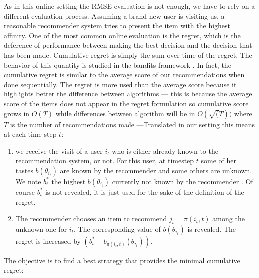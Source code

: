 \documentclass[twoside,leqno,twocolumn]{article}
\newcommand{\pp}[1]{\color{red}(pp) #1\color{black}}
\newcommand{\jm}[1]{{\color{TealBlue}(jm) #1\color{black}}}
\newcommand{\hai}[1]{\color{blue}(hai) #1\color{black}}
\begin{document}
As in this online setting the RMSE evaluation is not enough, we have to rely on a different evaluation process.
Assuming a brand new user is visiting us, a reasonable recommender system tries to present the item with the highest affinity. %
One of the most common online evaluation is the regret, which is the deference of performance between making the best decision and the decision that has been made. Cumulative regret is simply the sum over time of the regret. The behavior of this quantity is studied in the bandits framework \cite{Auer:2002:FAM:599614.599677, DBLP:conf/nips/Abbasi-YadkoriPS11}.  
In fact, the cumulative regret is similar to the average score of our recommendations when done sequentially. The regret is more used than the average score because it highlights better the difference between algorithms --- this is because the average score of the items does not appear in the regret formulation so cumulative score grows in $O(T)$ while differences between algorithm will be in $O(\sqrt(T))$ where $T$ is the number of recommendations made ---Translated in our setting this means at each time step $t$:

\begin{enumerate}
  \item we receive the visit of a user $i_t$ who is either already
    known to the recommendation system, or not. For this user, at
    timestep $t$ some of her tastes $b(\theta_{i_t})$ are known by the
    recommender and some others are unknown. We note $b^*_t$ the highest
    $b(\theta_{i_t})$ currently not known by the recommender . Of course $b^{*}_{t}$ is not revealed, it is just used for the sake of the definition of the regret. 
  \item The recommender chooses an item to recommend $j_t =
    \pi(i_t,t)$ among the unknown one for $i_t$. The corresponding value of $b(\theta_{i_t})$ is
    revealed. The regret is increased by $(b^{*}_{t}-b_{\pi(i_t,t)}(\theta_{i{_t}}))$.
\end{enumerate}

The objective is to find a best strategy that provides the minimal cumulative regret:
\end{document}
